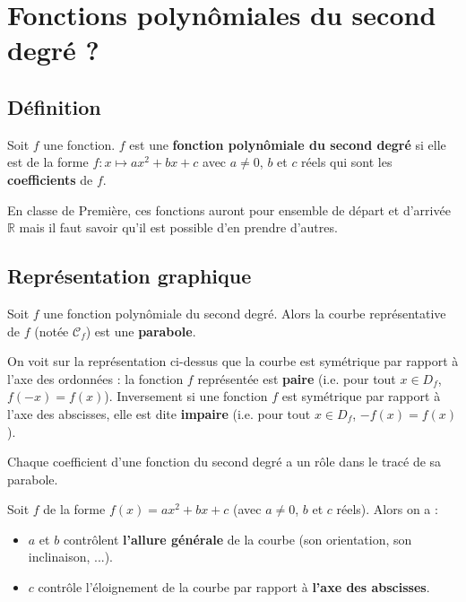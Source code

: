 



	\section{Fonctions polynômiales du second degré ?}

	\subsection{Définition}

	\begin{formula}[Définition]
		Soit $f$ une fonction. $f$ est une \textbf{fonction polynômiale du second degré} si elle est de la forme $f : x \mapsto ax^2 + bx + c$ avec $a \neq 0$, $b$ et $c$ réels qui sont les \textbf{coefficients} de $f$.
	\end{formula}

	En classe de Première, ces fonctions auront pour ensemble de départ et d'arrivée $\mathbb{R}$ mais il faut savoir qu'il est possible d'en prendre d'autres.

	\subsection{Représentation graphique}

	\begin{formula}[Parabole]
		Soit $f$ une fonction polynômiale du second degré. Alors la courbe représentative de $f$ (notée $\mathcal{C}_f$) est une \textbf{parabole}.
	\end{formula}


	\begin{tip}
		On voit sur la représentation ci-dessus que la courbe est symétrique par rapport à l'axe des ordonnées : la fonction $f$ représentée est \textbf{paire} (i.e. pour tout $x \in D_f$, $f(-x) = f(x)$).
		\newpar
		Inversement si une fonction $f$ est symétrique par rapport à l'axe des abscisses, elle est dite \textbf{impaire} (i.e. pour tout $x \in D_f$, $-f(x) = f(x)$).
	\end{tip}

	Chaque coefficient d'une fonction du second degré a un rôle dans le tracé de sa parabole.

	\begin{formula}
		Soit $f$ de la forme $f(x) = ax^2 + bx +c$ (avec $a \neq 0$, $b$ et $c$ réels). Alors on a :
		\begin{itemize}
			\item $a$ et $b$ contrôlent \textbf{l'allure générale} de la courbe (son orientation, son inclinaison, ...).
			\item $c$ contrôle l'éloignement de la courbe par rapport à \textbf{l'axe des abscisses}.
		\end{itemize}
	\end{formula}

